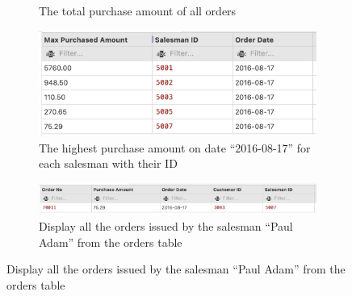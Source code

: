 \begin{figure}[H]
\begin{subfigure}{.5\textwidth}
        \caption*{The total purchase amount of all orders}
        \label{fig:q4}
    \end{subfigure}
    \begin{subfigure}{.5\textwidth}
        \centering
        \includegraphics[width=.8\linewidth]{images/output/q5.png}
        \caption*{The highest purchase amount on date “2016-08-17” for each
            salesman with their ID}
        \label{fig:q5}
    \end{subfigure}
    \begin{subfigure}{1\textwidth}
        \centering
        \includegraphics[width=.8\linewidth]{images/output/q6.png}
        \caption*{Display all the orders issued by the salesman “Paul Adam” from
            the orders table}
        \label{fig:q6}
    \end{subfigure}
\end{figure}
